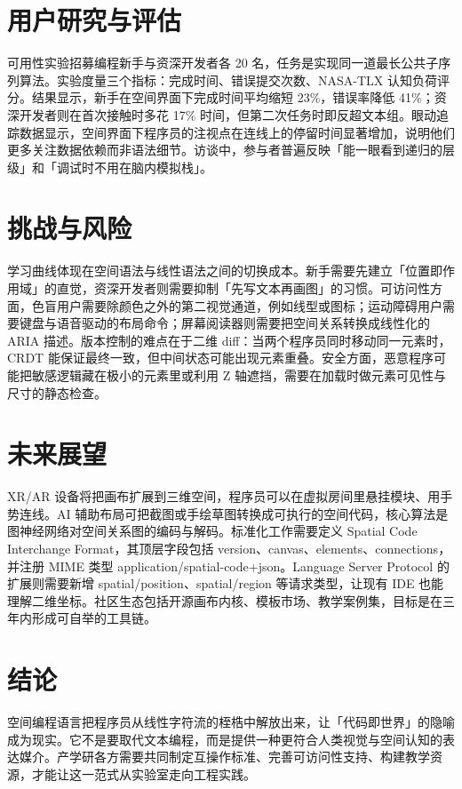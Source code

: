 \chapter{用户研究与评估}
可用性实验招募编程新手与资深开发者各 20 名，任务是实现同一道最长公共子序列算法。实验度量三个指标：完成时间、错误提交次数、NASA-TLX 认知负荷评分。结果显示，新手在空间界面下完成时间平均缩短 23\%{}，错误率降低 41\%{}；资深开发者则在首次接触时多花 17\%{} 时间，但第二次任务时即反超文本组。眼动追踪数据显示，空间界面下程序员的注视点在连线上的停留时间显著增加，说明他们更多关注数据依赖而非语法细节。访谈中，参与者普遍反映「能一眼看到递归的层级」和「调试时不用在脑内模拟栈」。\par
\chapter{挑战与风险}
学习曲线体现在空间语法与线性语法之间的切换成本。新手需要先建立「位置即作用域」的直觉，资深开发者则需要抑制「先写文本再画图」的习惯。可访问性方面，色盲用户需要除颜色之外的第二视觉通道，例如线型或图标；运动障碍用户需要键盘与语音驱动的布局命令；屏幕阅读器则需要把空间关系转换成线性化的 ARIA 描述。版本控制的难点在于二维 diff：当两个程序员同时移动同一元素时，CRDT 能保证最终一致，但中间状态可能出现元素重叠。安全方面，恶意程序可能把敏感逻辑藏在极小的元素里或利用 Z 轴遮挡，需要在加载时做元素可见性与尺寸的静态检查。\par
\chapter{未来展望}
XR/AR 设备将把画布扩展到三维空间，程序员可以在虚拟房间里悬挂模块、用手势连线。AI 辅助布局可把截图或手绘草图转换成可执行的空间代码，核心算法是图神经网络对空间关系图的编码与解码。标准化工作需要定义 Spatial Code Interchange Format，其顶层字段包括 version、canvas、elements、connections，并注册 MIME 类型 application/spatial-code+json。Language Server Protocol 的扩展则需要新增 spatial/position、spatial/region 等请求类型，让现有 IDE 也能理解二维坐标。社区生态包括开源画布内核、模板市场、教学案例集，目标是在三年内形成可自举的工具链。\par
\chapter{结论}
空间编程语言把程序员从线性字符流的桎梏中解放出来，让「代码即世界」的隐喻成为现实。它不是要取代文本编程，而是提供一种更符合人类视觉与空间认知的表达媒介。产学研各方需要共同制定互操作标准、完善可访问性支持、构建教学资源，才能让这一范式从实验室走向工程实践。\par

